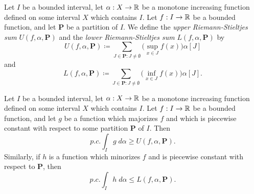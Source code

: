 \begin{ac}\label{i:ac:11.8.12}
  Let \(I\) be a bounded interval, let \(\alpha : X \to \mathbb{R}\) be a monotone increasing function defined on some interval \(X\) which contains \(I\).
  Let \(f : I \to \mathbb{R}\) be a bounded function, and let \(\mathbf{P}\) be a partition of \(I\).
  We define the \emph{upper Riemann-Stieltjes sum} \(U(f, \alpha, \mathbf{P})\) and the \emph{lower Riemann-Stieltjes sum} \(L(f, \alpha, \mathbf{P})\) by
  \[
    U(f, \alpha, \mathbf{P}) \coloneqq \sum_{J \in \mathbf{P} : J \neq \emptyset} \big(\sup_{x \in J} f(x)\big) \alpha[J]
  \]
  and
  \[
    L(f, \alpha, \mathbf{P}) \coloneqq \sum_{J \in \mathbf{P} : J \neq \emptyset} \big(\inf_{x \in J} f(x)\big) \alpha[J].
  \]
\end{ac}

\begin{ac}\label{i:ac:11.8.13}
  Let \(I\) be a bounded interval, let \(\alpha : X \to \mathbb{R}\) be a monotone increasing function defined on some interval \(X\) which contains \(I\).
  Let \(f : I \to \mathbb{R}\) be a bounded function, and let \(g\) be a function which majorizes \(f\) and which is piecewise constant with respect to some partition \(\mathbf{P}\) of \(I\).
  Then
  \[
    p.c. \int_I g \; d \alpha \geq U(f, \alpha, \mathbf{P}).
  \]
  Similarly, if \(h\) is a function which minorizes \(f\) and is piecewise constant with respect to \(\mathbf{P}\), then
  \[
    p.c. \int_I h \; d \alpha \leq L(f, \alpha, \mathbf{P}).
  \]
\end{ac}

